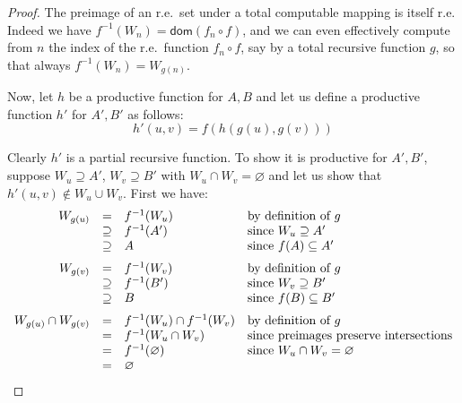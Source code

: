 \documentclass[a4paper,10pt]{amsart}
\renewcommand{\emptyset}{\varnothing}
\theoremstyle{definition}
\newcommand{\dom}[1]{\mathsf{dom}(#1)}
\newcommand{\prf}[1]{f_{#1}}
\newcommand{\res}[1]{W_{#1}}
\newcommand{\inv}[1]{#1^{-1}}
\begin{document}
\begin{proof}
The preimage of an r.e.\ set under a total computable mapping is itself r.e.
Indeed we have $\inv f (\res n) = \dom {\prf n \circ f}$, and we can even effectively compute from $n$ the index of the r.e.\ function $\prf n\circ f $, say by a total recursive function $g$, so that always $\inv f(\res n) = \res {g(n)}$.

Now, let $h$ be a productive function for $A,B$ and let us define a productive function $h'$ for $A',B'$ as follows: \[h'(u,v) = f(h(g(u), g(v)))\] 

Clearly $h'$ is a partial recursive function.
To show it is productive for $A',B'$, suppose
  $\res u \supseteq A'$, $\res v \supseteq B'$ with
  $\res u \cap \res v = \emptyset$ and let us show that $h'(u,v) \notin \res u \cup \res v$. 
First we have:
\[
\begin{array}{rcll}
     \res{g(u)} & = & \inv f (\res u ) & \text{by definition of $g$} \\
        & \supseteq & \inv f (A') & \text{since $\res u \supseteq A'$} \\
        & \supseteq & A & \text{since $f(A) \subseteq A'$} \\
    \noalign{\medskip}
    \res{g(v)} & = & \inv f (\res v ) & \text{by definition of $g$} \\
        & \supseteq & \inv f (B') & \text{since $\res v \supseteq B'$} \\
        & \supseteq & B & \text{since $f(B) \subseteq B'$} \\
    \noalign{\medskip}
    \res{g(u)} \cap \res{g(v)} & = & \inv f (\res u) \cap \inv f (\res v) & \text{by definition of $g$} \\
        & = & \inv f (\res u \cap \res v ) & \text{since preimages preserve intersections}\\
        & = & \inv f (\emptyset) & \text{since $\res u \cap \res v = \emptyset$} \\
        & = & \emptyset
\end{array}
\]




\end{proof}
\end{document}

